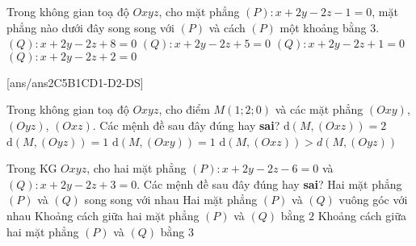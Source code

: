 \begin{ex}%
	Trong không gian toạ độ $Oxyz$, cho mặt phẳng $(P)\colon x+2y-2z-1=0$, mặt phẳng nào dưới đây song song với $(P)$ và cách $(P)$ một khoảng bằng $3$.
	\choice
	{\True $(Q)\colon x+2y-2z+8=0$}
	{$(Q)\colon x+2y-2z+5=0$}
	{$(Q)\colon x+2y-2z+1=0$}
	{$(Q)\colon x+2y-2z+2=0$}
\end{ex}
\TNTF
{}[ans/ans2C5B1CD1-D2-DS]
\begin{ex}%
	Trong không gian toạ độ $Oxyz$, cho điểm $M\left(1;2;0\right)$ và các mặt phẳng $(Oxy)$, $(Oyz)$, $(Oxz)$. Các mệnh đề sau đây đúng hay \textbf{sai}?
	\choiceTF
	{\True $\mathrm{d}\left(M,(Oxz)\right)=2$}
	{\True $\mathrm{d}\left(M,(Oyz)\right)=1$}
	{$\mathrm{d}\left(M,(Oxy)\right)=1$}
	{\True $\mathrm{d}\left(M,(Oxz)\right)>d\left(M,(Oyz)\right)$}
\end{ex}
\begin{ex}%
	Trong KG $Oxyz$, cho hai mặt phẳng $(P)\colon x+2y-2z-6=0$ và $(Q)\colon x+2y-2z+3=0$. Các mệnh đề sau đây đúng hay \textbf{sai}?
	\choiceTF
	{\True Hai mặt phẳng $(P)$ và $(Q)$ song song với nhau}
	{Hai mặt phẳng $(P)$ và $(Q)$ vuông góc với nhau}
	{Khoảng cách giữa hai mặt phẳng $(P)$ và $(Q)$ bằng $2$}
	{\True Khoảng cách giữa hai mặt phẳng $(P)$ và $(Q)$ bằng $3$}
\end{ex}

